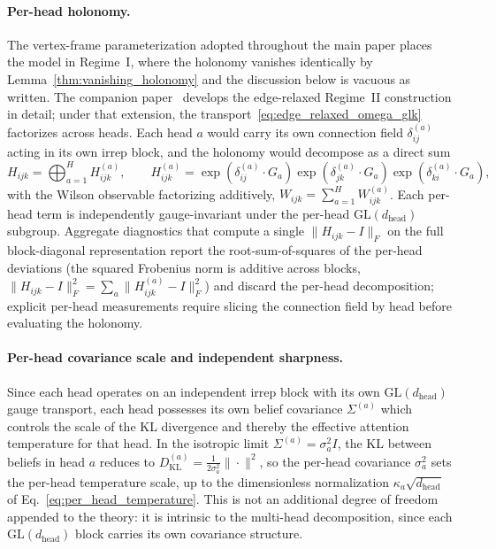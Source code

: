 \documentclass[twoside,11pt]{article}
\begin{document}
\paragraph{Per-head holonomy.} The vertex-frame parameterization adopted throughout the main paper places the model in Regime~I, where the holonomy vanishes identically by Lemma~\ref{thm:vanishing_holonomy} and the discussion below is vacuous as written. The companion paper~\citep{Dennis2025it} develops the edge-relaxed Regime~II construction in detail; under that extension, the transport~\eqref{eq:edge_relaxed_omega_glk} factorizes across heads. Each head $a$ would carry its own connection field $\delta_{ij}^{(a)}$ acting in its own irrep block, and the holonomy would decompose as a direct sum
\begin{equation}
H_{ijk} = \bigoplus_{a=1}^{H} H_{ijk}^{(a)},
\qquad
H_{ijk}^{(a)} = \exp(\delta_{ij}^{(a)}\cdot G_a) \exp(\delta_{jk}^{(a)}\cdot G_a) \exp(\delta_{ki}^{(a)}\cdot G_a),
\end{equation}
with the Wilson observable factorizing additively, $W_{ijk} = \sum_{a=1}^H W_{ijk}^{(a)}$. Each per-head term is independently gauge-invariant under the per-head $\mathrm{GL}(d_{\text{head}})$ subgroup. Aggregate diagnostics that compute a single $\|H_{ijk} - I\|_F$ on the full block-diagonal representation report the root-sum-of-squares of the per-head deviations (the squared Frobenius norm is additive across blocks, $\|H_{ijk}-I\|_F^2 = \sum_a \|H_{ijk}^{(a)}-I\|_F^2$) and discard the per-head decomposition; explicit per-head measurements require slicing the connection field by head before evaluating the holonomy.

\paragraph{Per-head covariance scale and independent sharpness.}
Since each head operates on an independent irrep block with its own $\mathrm{GL}(d_{\text{head}})$ gauge transport, each head possesses its own belief covariance $\Sigma^{(a)}$ which controls the scale of the KL divergence and thereby the effective attention temperature for that head. In the isotropic limit $\Sigma^{(a)} = \sigma_a^2 I$, the KL between beliefs in head $a$ reduces to $D_{\mathrm{KL}}^{(a)} = \frac{1}{2\sigma_a^2}\|\cdot\|^2$, so the per-head covariance $\sigma_a^2$ sets the per-head temperature scale, up to the dimensionless normalization $\kappa_a\sqrt{d_{\text{head}}}$ of Eq.~\eqref{eq:per_head_temperature}. This is not an additional degree of freedom appended to the theory: it is intrinsic to the multi-head decomposition, since each $\mathrm{GL}(d_{\text{head}})$ block carries its own covariance structure.
\end{document}
